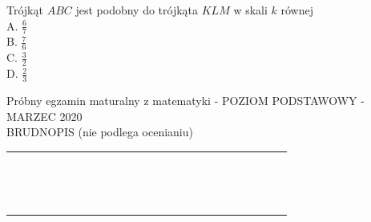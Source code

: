 \documentclass[10pt]{article}
\begin{document}
Trójkąt \(A B C\) jest podobny do trójkąta \(K L M\) w skali \(k\) równej\\
A. \(\frac{6}{7}\)\\
B. \(\frac{7}{6}\)\\
C. \(\frac{3}{2}\)\\
D. \(\frac{2}{3}\)

Próbny egzamin maturalny z matematyki - POZIOM PODSTAWOWY - MARZEC 2020\\
BRUDNOPIS (nie podlega ocenianiu)

\begin{center}
\begin{tabular}{|c|c|c|c|c|c|c|c|c|c|c|c|c|c|c|c|c|c|c|c|c|c|c|c|c|}
\hline
 &  &  &  &  &  &  &  &  &  &  &  &  &  &  &  &  &  &  &  &  &  &  &  &  \\
\hline
 &  &  &  &  &  &  &  &  &  &  &  &  &  &  &  &  &  &  &  &  &  &  &  &  \\
\hline
 &  &  &  &  &  &  &  &  &  &  &  &  &  &  &  &  &  &  &  &  &  &  &  &  \\
\hline
 &  &  &  &  &  &  &  &  &  &  &  &  &  &  &  &  &  &  &  &  &  &  &  &  \\
\hline
 &  &  &  &  &  &  &  &  &  &  &  &  &  &  &  &  &  &  &  &  &  &  &  &  \\
\hline
 &  &  &  &  &  &  &  &  &  &  &  &  &  &  &  &  &  &  &  &  &  &  &  &  \\
\hline
 &  &  &  &  &  &  &  &  &  &  &  &  &  &  &  &  &  &  &  &  &  &  &  &  \\
\hline
 &  &  &  &  &  &  &  &  &  &  &  &  &  &  &  &  &  &  &  &  &  &  &  &  \\
\hline
 &  &  &  &  &  &  &  &  &  &  &  &  &  &  &  &  &  &  &  &  &  &  &  &  \\
\hline
 &  &  &  &  &  &  &  &  &  &  &  &  &  &  &  &  &  &  &  &  &  &  &  &  \\
\hline
 &  &  &  &  &  &  &  &  &  &  &  &  &  &  &  &  &  &  &  &  &  &  &  &  \\
\hline
 &  &  &  &  &  &  &  &  &  &  &  &  &  &  &  &  &  &  &  &  &  &  &  &  \\
\hline
 &  &  &  &  &  &  &  &  &  &  &  &  &  &  &  &  &  &  &  &  &  &  &  &  \\
\hline
 &  &  &  &  &  &  &  &  &  &  &  &  &  &  &  &  &  &  &  &  &  &  &  &  \\
\hline
 &  &  &  &  &  &  &  &  &  &  &  &  &  &  &  &  &  &  &  &  &  &  &  &  \\
\hline
 &  &  &  &  &  &  &  &  &  &  &  &  &  &  &  &  &  &  &  &  &  &  &  &  \\

\end{tabular}
\end{center}
\end{document}
